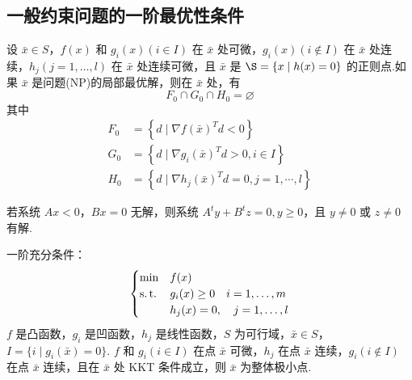 \subsection{一般约束问题的一阶最优性条件}
\begin{theorem}
    设 $\bar{x} \in S$，$f(x)$ 和 $g_i(x)(i\in I)$ 在 $\bar{x}$ 处可微，$g_i(x) (i \notin I)$ 在 $\bar{x}$ 处连续，$h_j(j = 1, \dots, l)$ 在 $\bar{x}$ 处连续可微，且 $\bar{x}$ 是 $\S = \{x \mid h(x) = 0\}$ 的正则点.如果 $\bar{x}$ 是问题(NP)的局部最优解，则在 $\bar{x}$ 处，有\[F_{0} \cap G_{0} \cap H_{0}=\varnothing\]其中
    \begin{align*}
        F_{0}&=\left\{d \mid \nabla f(\bar{x})^{T} d<0\right\} \\
        G_{0}&=\left\{d \mid \nabla g_{i}(\bar{x})^{T} d>0, i \in I\right\} \\
        H_{0}&=\left\{d \mid \nabla h_{j}(\bar{x})^{T} d=0, j=1, \cdots, l\right\}
    \end{align*}
\end{theorem}

\begin{theorem}
    若系统 $Ax < 0$，$Bx = 0$ 无解，则系统 $A^ty + B^tz = 0, y \ge 0$，且 $y \neq 0$ 或 $z \neq 0$ 有解.
\end{theorem}

\begin{note}
    一阶充分条件：\[\begin{cases}
        \min &f(x)\\
        \operatorname{s.t.} &g_i(x) \ge 0 \quad i = 1, \dots, m\\
        &h_j(x) = 0, \quad j = 1, \dots, l
    \end{cases}\]
    $f$ 是凸函数，$g_i$ 是凹函数，$h_j$ 是线性函数，$S$ 为可行域，$\bar{x} \in S$，$I = \{i \mid g_i(\bar{x}) = 0\}$. $f$ 和 $g_i(i \in I)$ 在点 $\bar{x}$ 可微，$h_j$ 在点 $\bar{x}$ 连续，$g_i(i \notin I)$ 在点 $\bar{x}$ 连续，且在 $\bar{x}$ 处 KKT 条件成立，则 $\bar{x}$ 为整体极小点.
\end{note}
